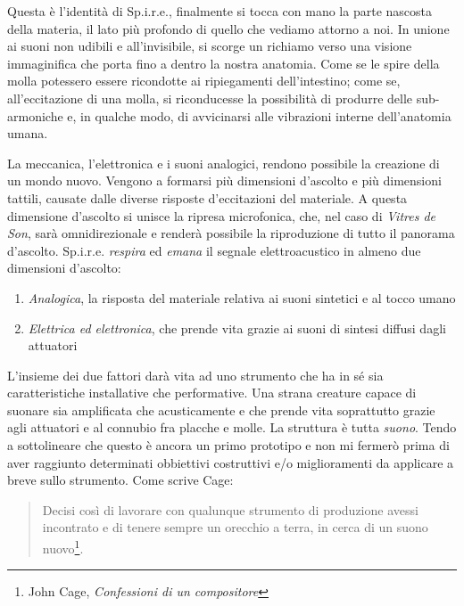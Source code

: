 Questa è l'identità di Sp.i.r.e., finalmente si tocca con mano la parte nascosta della materia, il lato più profondo di quello che vediamo attorno a noi. In unione ai suoni non udibili e all'invisibile, si scorge un richiamo verso una visione immaginifica che porta fino a dentro la nostra anatomia. Come se le spire della molla potessero essere ricondotte ai ripiegamenti dell'intestino; come se, all'eccitazione di una molla, si riconducesse la possibilità di produrre delle sub-armoniche e, in qualche modo, di avvicinarsi alle vibrazioni interne dell'anatomia umana.

La meccanica, l'elettronica e i suoni analogici, rendono possibile la creazione di un mondo nuovo. Vengono a formarsi più dimensioni d'ascolto e più dimensioni tattili, causate dalle diverse risposte d'eccitazioni del materiale. A questa dimensione d'ascolto si unisce la ripresa microfonica, che, nel caso di \textit{Vitres de Son}, sarà omnidirezionale e renderà possibile la riproduzione di tutto il panorama d'ascolto. Sp.i.r.e. \textit{respira} ed \textit{emana} il segnale elettroacustico in almeno due dimensioni d'ascolto:
\begin{enumerate}
\item{\textit{Analogica}, la risposta del materiale relativa ai suoni sintetici e al tocco umano}
\item{\textit{Elettrica ed elettronica}, che prende vita grazie ai suoni di sintesi diffusi dagli attuatori}
\end{enumerate}

L'insieme dei due fattori darà vita ad uno strumento che ha in sé sia caratteristiche installative che performative. Una strana creature capace di suonare sia amplificata che acusticamente e che prende vita soprattutto grazie agli attuatori e al connubio fra placche e molle. La struttura è tutta \textit{suono}. Tendo a sottolineare che questo è ancora un primo prototipo e non mi fermerò prima di aver raggiunto determinati obbiettivi costruttivi e/o miglioramenti da applicare a breve sullo strumento. Come scrive Cage:

\begin{small}
\begin{quotation}
Decisi così di lavorare con qualunque strumento di produzione avessi incontrato e di tenere sempre un orecchio a terra, in cerca di un suono nuovo\footnote{John Cage, \textit{Confessioni di un compositore}}.
\end{quotation}
\end{small}

